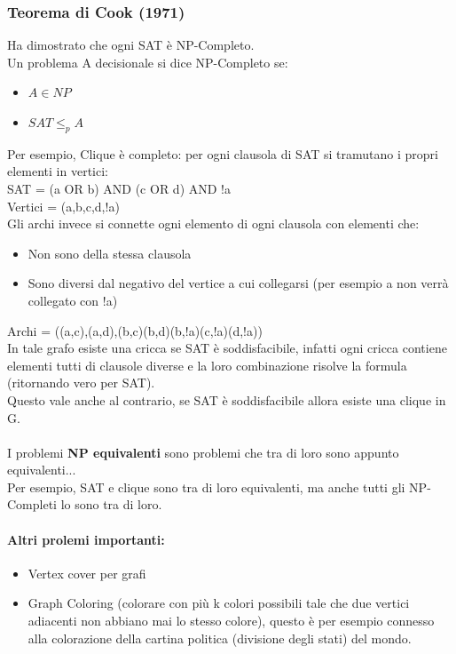 \documentclass[a4paper,12pt]{article}
\begin{document}
\subsubsection{Teorema di Cook (1971)}
Ha dimostrato che ogni SAT è NP-Completo.\\
Un problema A decisionale si dice NP-Completo se:
\begin{itemize}
    \item $A \in NP$
    \item $SAT \leq_p A$
\end{itemize}
Per esempio, Clique è completo: per ogni clausola di SAT si tramutano i propri elementi in vertici:\\
SAT = (a OR b) AND (c OR d) AND !a\\
Vertici = (a,b,c,d,!a)\\
Gli archi invece si connette ogni elemento di ogni clausola con elementi che:
\begin{itemize}
    \item Non sono della stessa clausola
    \item Sono diversi dal negativo del vertice a cui collegarsi (per esempio a non verrà collegato con !a)
\end{itemize}
Archi = ((a,c),(a,d),(b,c)(b,d)(b,!a)(c,!a)(d,!a))\\
In tale grafo esiste una cricca se SAT è soddisfacibile, infatti ogni cricca contiene elementi tutti di clausole diverse e la loro combinazione risolve la formula (ritornando vero per SAT).\\
Questo vale anche al contrario, se SAT è soddisfacibile allora esiste una clique in G.\\\\
I problemi \textbf{NP equivalenti} sono problemi che tra di loro sono appunto equivalenti...\\
Per esempio, SAT e clique sono tra di loro equivalenti, ma anche tutti gli NP-Completi lo sono tra di loro.\\
\paragraph{Altri prolemi importanti:}
\begin{itemize}
    \item Vertex cover per grafi
    \item Graph Coloring (colorare con più k colori possibili tale che due vertici adiacenti non abbiano mai lo stesso colore), questo è per esempio connesso alla colorazione della cartina politica (divisione degli stati) del mondo.
\end{itemize}
\end{document}
